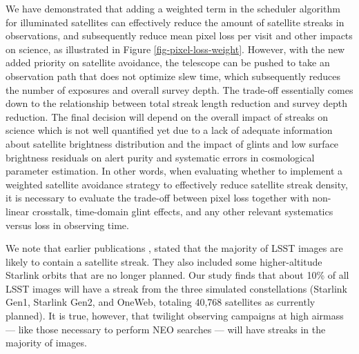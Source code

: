 \documentclass[twocolumn]{aastex631}
\begin{document}
We have demonstrated that adding a weighted term in the scheduler algorithm for illuminated satellites can effectively reduce the amount of satellite streaks in observations, and subsequently reduce mean pixel loss per visit and other impacts on science, as illustrated in Figure \ref{fig-pixel-loss-weight}. 
However, with the new added priority on satellite avoidance, the telescope can be pushed to take an observation path that does not optimize slew time, which subsequently reduces the number of exposures and overall survey depth. The trade-off essentially comes down to the relationship between total streak length reduction and survey depth reduction. The final decision will depend on the overall impact of streaks on science which is not well quantified yet due to a lack of adequate information about satellite brightness distribution and the impact of glints and low surface brightness residuals on alert purity and systematic errors in cosmological parameter estimation. In other words, 
when evaluating whether to implement a weighted satellite avoidance strategy to effectively reduce satellite streak density, it is necessary to evaluate the trade-off between pixel loss together with non-linear crosstalk, time-domain glint effects, and any other relevant systematics versus loss in observing time. 

We note that earlier publications \citep{lawrence22,tyson20}, stated that the majority of LSST images are likely to contain a satellite streak. They also included some higher-altitude Starlink orbits that are no longer planned. Our study finds that about 10\% of all LSST images will have a streak from the three simulated constellations (Starlink Gen1, Starlink Gen2, and OneWeb, totaling 40,768 satellites as currently planned). It is true, however, that twilight observing campaigns at high airmass --- like those necessary to perform NEO searches --- will have streaks in the majority of images.
\end{document}
